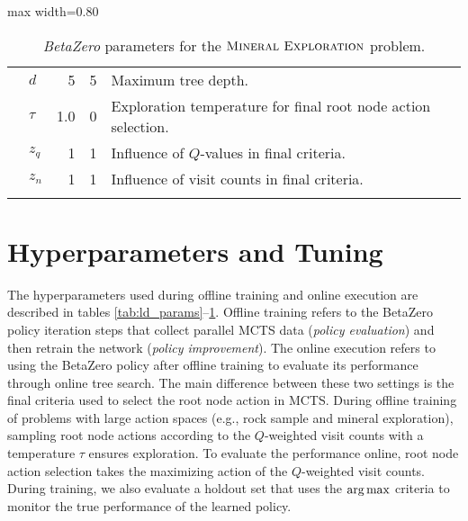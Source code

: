\begin{table*}[pb!]
\begin{adjustbox}{max width=0.80\textwidth}
\begin{threeparttable}
\begin{footnotesize}
\begin{tabular}{@{}clrrm{9cm}@{}}
              & $d$ & \num{5} & \num{5} & Maximum tree depth. \\
              & $\tau$ & \num{1.0} & \num{0} & Exploration temperature for final root node action selection. \\
              & $z_q$ & \num{1} & \num{1} & Influence of $Q$-values in final criteria. \\
              & $z_n$ & \num{1} & \num{1} & Influence of visit counts in final criteria. \\
            \arrayrulecolor{black} %
            \bottomrule
        \end{tabular}
        \end{footnotesize}
    \end{threeparttable}
    \end{adjustbox}
    \caption{\textit{BetaZero} parameters for the $\textsc{Mineral Exploration}$ problem.}\label{tab:minex_params}
\end{table*}


\section*{Hyperparameters and Tuning}

The hyperparameters used during offline training and online execution are described in tables \ref{tab:ld_params}--\ref{tab:minex_params}.
Offline training refers to the BetaZero policy iteration steps that collect parallel MCTS data (\textit{policy evaluation}) and then retrain the network (\textit{policy improvement}).
The online execution refers to using the BetaZero policy after offline training to evaluate its performance through online tree search.
The main difference between these two settings is the final criteria used to select the root node action in MCTS.
During offline training of problems with large action spaces (e.g., rock sample and mineral exploration), sampling root node actions according to the $Q$-weighted visit counts with a temperature $\tau$ ensures exploration.
To evaluate the performance online, root node action selection takes the maximizing action of the $Q$-weighted visit counts.
During training, we also evaluate a holdout set that uses the $\operatorname*{arg\,max}$ criteria to monitor the true performance of the learned policy.

